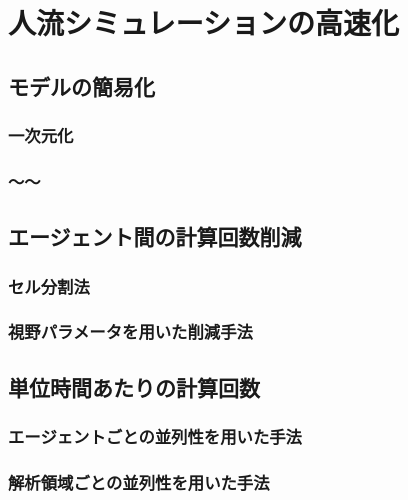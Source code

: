 \chapter{人流シミュレーションの高速化}
\label{sec:survey}

\section{モデルの簡易化}

\subsection{一次元化}

\subsection{～～}

\section{エージェント間の計算回数削減}

\subsection{セル分割法}

\subsection{視野パラメータを用いた削減手法}

\section{単位時間あたりの計算回数}

\subsection{エージェントごとの並列性を用いた手法}

\subsection{解析領域ごとの並列性を用いた手法}

